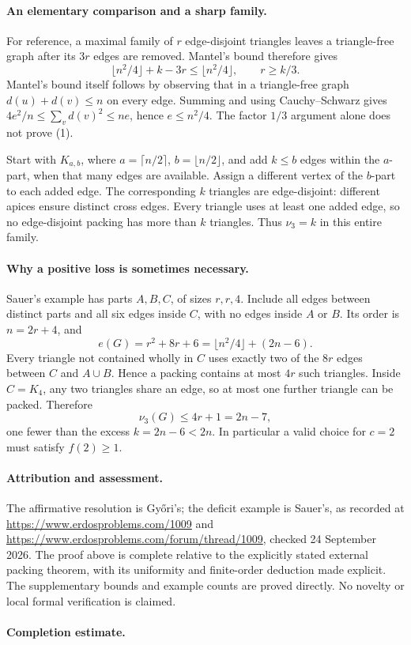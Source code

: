 \paragraph{An elementary comparison and a sharp family.}
For reference, a maximal family of \(r\) edge-disjoint triangles leaves a triangle-free graph after its \(3r\) edges are removed. Mantel's bound therefore gives
\[
 \lfloor n^2/4\rfloor+k-3r\leq\lfloor n^2/4\rfloor,
 \qquad r\geq k/3.
\]
Mantel's bound itself follows by observing that in a triangle-free graph \(d(u)+d(v)\leq n\) on every edge. Summing and using Cauchy--Schwarz gives
\(4e^2/n\leq\sum_vd(v)^2\leq ne\), hence \(e\leq n^2/4\). The factor \(1/3\) argument alone does not prove (1).

Start with \(K_{a,b}\), where \(a=\lceil n/2\rceil\), \(b=\lfloor n/2\rfloor\), and add \(k\leq b\) edges within the \(a\)-part, when that many edges are available. Assign a different vertex of the \(b\)-part to each added edge. The corresponding \(k\) triangles are edge-disjoint: different apices ensure distinct cross edges. Every triangle uses at least one added edge, so no edge-disjoint packing has more than \(k\) triangles. Thus \(\nu_3=k\) in this entire family.

\paragraph{Why a positive loss is sometimes necessary.}
Sauer's example has parts \(A,B,C\), of sizes \(r,r,4\). Include all edges between distinct parts and all six edges inside \(C\), with no edges inside \(A\) or \(B\). Its order is \(n=2r+4\), and
\[
 e(G)=r^2+8r+6
      =\lfloor n^2/4\rfloor+(2n-6).
\]
Every triangle not contained wholly in \(C\) uses exactly two of the \(8r\) edges between \(C\) and \(A\cup B\). Hence a packing contains at most \(4r\) such triangles. Inside \(C=K_4\), any two triangles share an edge, so at most one further triangle can be packed. Therefore
\[
 \nu_3(G)\leq4r+1=2n-7,
\]
one fewer than the excess \(k=2n-6<2n\). In particular a valid choice for \(c=2\) must satisfy \(f(2)\geq1\).

\paragraph{Attribution and assessment.}
The affirmative resolution is Gy\H{o}ri's; the deficit example is Sauer's, as recorded at \url{https://www.erdosproblems.com/1009} and \url{https://www.erdosproblems.com/forum/thread/1009}, checked 24 September 2026. The proof above is complete relative to the explicitly stated external packing theorem, with its uniformity and finite-order deduction made explicit. The supplementary bounds and example counts are proved directly. No novelty or local formal verification is claimed.

\paragraph{Completion estimate.}
